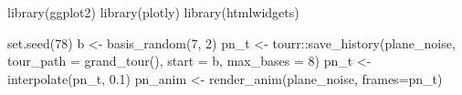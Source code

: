 \documentclass[
  letterpaper,
]{krantz}
\newenvironment{Shaded}{\begin{snugshade}}{\end{snugshade}}
\newcommand{\AttributeTok}[1]{\textcolor[rgb]{0.40,0.45,0.13}{#1}}
\newcommand{\DecValTok}[1]{\textcolor[rgb]{0.68,0.00,0.00}{#1}}
\newcommand{\FloatTok}[1]{\textcolor[rgb]{0.68,0.00,0.00}{#1}}
\newcommand{\FunctionTok}[1]{\textcolor[rgb]{0.28,0.35,0.67}{#1}}
\newcommand{\NormalTok}[1]{\textcolor[rgb]{0.00,0.23,0.31}{#1}}
\newcommand{\OtherTok}[1]{\textcolor[rgb]{0.00,0.23,0.31}{#1}}
\newcommand{\SpecialCharTok}[1]{\textcolor[rgb]{0.37,0.37,0.37}{#1}}
\begin{document}
\begin{Shaded}
\begin{Highlighting}[]
\FunctionTok{library}\NormalTok{(ggplot2)}
\FunctionTok{library}\NormalTok{(plotly)}
\FunctionTok{library}\NormalTok{(htmlwidgets)}

\FunctionTok{set.seed}\NormalTok{(}\DecValTok{78}\NormalTok{)}
\NormalTok{b }\OtherTok{\textless{}{-}} \FunctionTok{basis\_random}\NormalTok{(}\DecValTok{7}\NormalTok{, }\DecValTok{2}\NormalTok{)}
\NormalTok{pn\_t }\OtherTok{\textless{}{-}}\NormalTok{ tourr}\SpecialCharTok{::}\FunctionTok{save\_history}\NormalTok{(plane\_noise, }
                    \AttributeTok{tour\_path =} \FunctionTok{grand\_tour}\NormalTok{(),}
                    \AttributeTok{start =}\NormalTok{ b,}
                    \AttributeTok{max\_bases =} \DecValTok{8}\NormalTok{)}
\NormalTok{pn\_t }\OtherTok{\textless{}{-}} \FunctionTok{interpolate}\NormalTok{(pn\_t, }\FloatTok{0.1}\NormalTok{)}
\NormalTok{pn\_anim }\OtherTok{\textless{}{-}} \FunctionTok{render\_anim}\NormalTok{(plane\_noise,}
                         \AttributeTok{frames=}\NormalTok{pn\_t)}


\end{Highlighting}
\end{Shaded}
\end{document}
